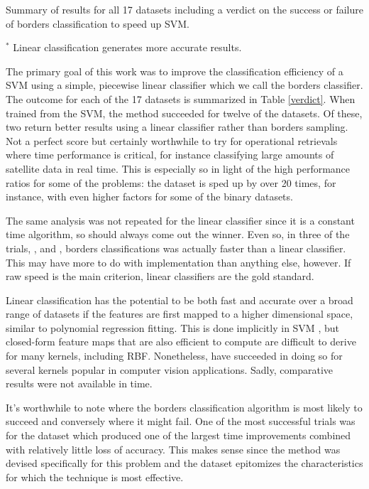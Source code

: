 \label{conclusion}

\begin{table}
	\caption{Summary of results for all 17 datasets including a verdict on the success or failure of borders classification to speed up SVM.}
	\label{verdict}
	

	\vspace{1 ex}

	\raggedright 
	$^*$ Linear classification generates more accurate results.
\end{table}

The primary goal of this work was to improve the classification efficiency of a SVM
using a simple, piecewise linear classifier which we call the borders classifier.
The outcome for each of the 17 datasets is summarized in Table \ref{verdict}.
When trained from the SVM, the method succeeded for twelve of the datasets.
Of these, two return better results using a linear classifier rather than
borders sampling.
Not a perfect score but certainly worthwhile to try for operational retrievals
where time performance is critical, 
for instance classifying large amounts of satellite data in real time.
This is especially so in light of the high performance ratios for some of the problems:
the  dataset is sped up by over 20 times,
for instance, with even higher factors for some of the binary datasets.

The same analysis was not repeated for the linear classifier since 
it is a constant time algorithm, so should always come out the winner.
Even so, in three of the trials, ,  and
, borders classifications was actually faster than a linear
classifier. This may have more to do with implementation than anything else,
however. If raw speed is the main criterion, linear classifiers are
the gold standard. 

Linear classification has the potential to be both fast
and accurate over a broad range of datasets if the features are first mapped
to a higher dimensional space, similar to polynomial regression fitting.
This is done implicitly in SVM \citep{Mueller_etal2001}, but closed-form
feature maps that are also efficient to compute
are difficult to derive for many kernels, including RBF. 
Nonetheless, \citet{Vedaldi_Zisserman2012} have succeeded in doing so for
several kernels popular in computer vision applications.
Sadly, comparative results were not available in time.

It's worthwhile to note where the borders classification algorithm 
is most likely to succeed and conversely where it might fail.
One of the most successful trials was for the  dataset which produced one of
the largest time improvements combined with relatively little loss of accuracy.
This makes sense since the method was devised specifically for this problem and
the  dataset epitomizes the characteristics for which the technique is most
effective.

